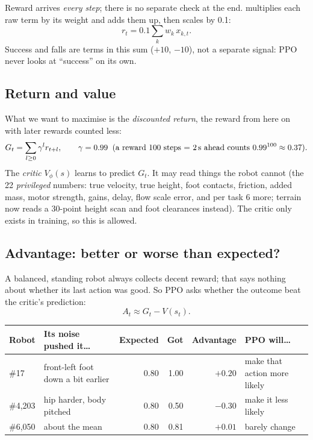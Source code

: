 \documentclass[10pt,letterpaper]{article}
\newcommand{\cc}[1]{\texttt{\detokenize{#1}}}
\begin{document}
Reward arrives \emph{every step}; there is no separate check at the end. \cc{finish()} multiplies each raw term by its weight
and adds them up, then scales by 0.1:
\[ r_t = 0.1\sum_k w_k\, x_{k,t}. \]
Success and falls are terms in this sum ($+10$, $-10$), not a separate signal: PPO never looks at ``success'' on its own.

\subsection{Return and value}
What we want to maximise is the \emph{discounted return}, the reward from here on with later rewards counted less:
\[
G_t=\sum_{l\ge0}\gamma^l r_{t+l},\qquad \gamma=0.99 \;\;(\text{a reward 100 steps = 2\,s ahead counts }0.99^{100}\approx0.37).
\]
The \emph{critic} $V_\phi(s)$ learns to predict $G_t$. It may read things the robot cannot (the 22 \emph{privileged} numbers:
true velocity, true height, foot contacts, friction, added mass, motor strength, gains, delay, flow scale error, and per task
6 more; terrain now reads a 30-point height scan and foot clearances instead). The critic only exists in training, so this is allowed.

\subsection{Advantage: better or worse than expected?}
A balanced, standing robot always collects decent reward; that says nothing about whether its last action was good. So PPO asks
whether the outcome beat the critic's prediction:
\[ A_t \approx G_t - V(s_t). \]

\begin{small}
\begin{tabularx}{\linewidth}{@{}lXrrrX@{}}
\toprule
Robot & Its noise pushed it\ldots & Expected & Got & Advantage & PPO will\ldots \\ \midrule
\#17 & front-left foot down a bit earlier & 0.80 & 1.00 & $+0.20$ & make that action more likely \\
\#4{,}203 & hip harder, body pitched & 0.80 & 0.50 & $-0.30$ & make it less likely \\
\#6{,}050 & about the mean & 0.80 & 0.81 & $+0.01$ & barely change \\ \bottomrule
\end{tabularx}
\end{small}
\end{document}
